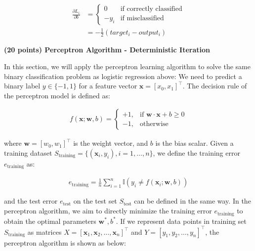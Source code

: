 \documentclass{article}
\newcommand{\x}{\mathbf{x}}
\newcommand{\w}{\mathbf{w}}
\begin{document}
\begin{probset}
\begin{prob}
\begin{subprobset}
\begin{subprob}
\begin{soln}
            \begin{align*}
                \frac{\partial L_i}{\partial b} &= \begin{cases}
                    0 & \text{if correctly classified} \\
                    -y_i & \text{if misclassified}
                \end{cases} \\
                &= -\frac{1}{2}(target_i - output_i)
            \end{align*}
        \end{soln}
    \end{subprob}
    \end{subprobset}
\end{prob}

\newpage

\begin{prob}
    \begin{subprobset}
    \begin{subprob}
        \textbf{(20 points) Perceptron Algorithm - Deterministic Iteration}

        In this section, we will apply the perceptron learning algorithm to solve the same binary classification problem as logistic regression above: We need to predict a binary label $y \in \{-1, 1\}$ for a feature vector $\x = [x_0, x_1]^\top$. The decision rule of the perceptron model is defined as:
        
        \begin{align} 
            f(\x; \w, b) = \begin{cases}
                +1, & \text{if } \w \cdot \x + b \geq 0 \\
                -1, & \text{otherwise}
            \end{cases}
        \end{align}

        where $\w = [w_0, w_1]^\top$ is the weight vector, and $b$ is the bias scalar. Given a training dataset $S_\text{training} = \{(\x_i, y_i), i = 1, \ldots, n\}$, we define the training error $e_\text{training}$ as:

        \begin{align}
            e_\text{training} = \frac{1}{n} \sum_{i=1}^n \mathbb{I}(y_i \neq f(\x_i; \w, b))
        \end{align}

        and the test error $e_\text{test}$ on the test set $S_\text{test}$ can be defined in the same way. In the perceptron algorithm, we aim to directly minimize the training error $e_\text{training}$ to obtain the optimal parameters $\w^*, b^*$. If we represent data points in training set $S_\text{training}$ as matrices $X = [\x_1, \x_2, \ldots, \x_n]^\top$ and $Y = [y_1, y_2, \ldots, y_n]^\top$, the perceptron algorithm is shown as below:


\end{subprob}
\end{subprobset}
\end{prob}
\end{probset}
\end{document}

